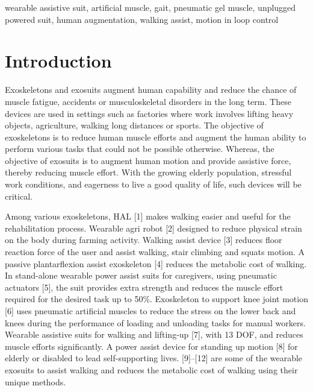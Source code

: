 \documentclass[paper,JRM,paper]{jaciiiarticle}
\begin{document}
\begin{keywords}
wearable assistive suit, artificial muscle, gait, pneumatic gel muscle, unplugged powered suit, human augmentation, walking assist, motion in loop control
\end{keywords}


\section{Introduction}

Exoskeletons and exosuits augment human capability and reduce the chance of muscle fatigue, accidents or musculoskeletal disorders in the long term. These devices are used in settings such as factories where work involves lifting heavy objects, agriculture, walking long distances or sports. The objective of exoskeletons is to reduce human muscle efforts and augment the human ability to perform various tasks that could not be possible otherwise. Whereas, the objective of exosuits is to augment human motion and provide assistive force, thereby reducing muscle effort. With the growing elderly population, stressful work conditions, and eagerness to live a good quality of life, such devices will be critical. 

Among various exoskeletons, HAL [1] makes walking easier and useful for the rehabilitation process. Wearable agri robot [2] designed to reduce physical strain on the body during farming activity. Walking assist device [3] reduces floor reaction force of the user and assist walking, stair climbing and squats motion. A passive plantarflexion assist exoskeleton [4] reduces the metabolic cost of walking. In stand-alone wearable power assist suits for caregivers, using pneumatic actuators [5], the suit provides extra strength and reduces the muscle effort required for the desired task up to 50\%. Exoskeleton to support knee joint motion [6] uses pneumatic artificial muscles to reduce the stress on the lower back and knees during the performance of loading and unloading tasks for manual workers. Wearable assistive suits for walking and lifting-up [7], with 13 DOF, and reduces muscle efforts significantly. A power assist device for standing up motion [8]	 for elderly or disabled to lead self-supporting lives. [9]–[12] are some of the wearable exosuits to assist walking and reduces the metabolic cost of walking using their unique methods. 
\end{document}

